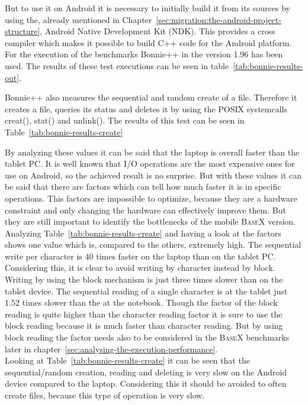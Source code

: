 But to use it on Android it is necessary to initially build it from its sources by using the, already mentioned in Chapter~\ref{sec:migration:the-android-project-structure}, Android Native Development Kit (NDK).
This provides a cross compiler which makes it possible to build C++ code for the Android platform.
For the execution of the benchmarks Bonnie++ in the version 1.96 has been used.
The results of these test executions can be seen in table~\ref{tab:bonnie-results-out}.

Bonnie++ also measures the sequential and random create of a file.
Therefore it creates a file, queries its status and deletes it by using the POSIX systemcalls \textsf{creat()}, \textsf{stat()} and \textsf{unlink()}.
The results of this test can be seen in Table~\ref{tab:bonnie-results-create}

By analyzing these values it can be said that the laptop is overall faster than the tablet PC.
It is well known that I/O operations are the most expensive ones for use on Android, so the achieved result is no surprise. 
But with these values it can be said that there are factors which can tell how much faster it is in specific operations.
This factors are impossible to optimize, because they are a hardware constraint and only changing the hardware can effectively improve them.
But they are still important to identify the bottlenecks of the mobile \textsc{BaseX} version.\\
Analyzing Table~\ref{tab:bonnie-results-create} and having a look at the factors shows one value which is, compared to the others, extremely high.
The sequential write per character is 40 times faster on the laptop than on the tablet PC.
Considering this, it is clear to avoid writing by character instead by block.
Writing by using the block mechanism is just three times slower than on the tablet device.
The sequential reading of a single character is at the tablet just 1.52 times slower than the at the notebook.
Though the factor of the block reading is quite higher than the character reading factor it is sure to use the block reading because it is much faster than character reading.
But by using block reading the factor needs also to be considered in the \textsc{BaseX} benchmarks later in chapter~\ref{sec:analysing-the-execution-performance}.
\\
Looking at Table~\ref{tab:bonnie-results-create} it can be seen that the sequential/random creation, reading and deleting is very slow on the Android device compared to the laptop.
Considering this it should be avoided to often create files, because this type of operation is very slow.\\
